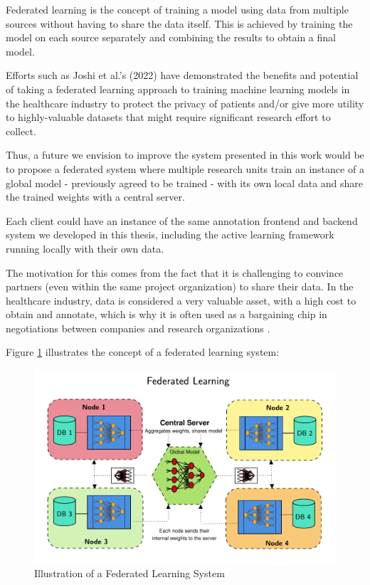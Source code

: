 \documentclass[../main.tex]{subfiles}
\begin{document}

    Federated learning is the concept of training a model using data from multiple sources without having to share the data itself. This is achieved by training the model on each source separately and combining the results to obtain a final model. 
    
    Efforts such as Joshi et al.'s (2022) \cite{joshi_federated_2022} have demonstrated the benefits and potential of taking a federated learning approach to training machine learning models in the healthcare industry to protect the privacy of patients and/or give more utility to highly-valuable datasets that might require significant research effort to collect.
    
    Thus, a future we envision to improve the system presented in this work would be to propose a federated system where multiple research units train an instance of a global model - previously agreed to be trained  - with its own local data and share the trained weights with a central server. 
    
    Each client could have an instance of the same annotation frontend and backend system we developed in this thesis, including the active learning framework running locally with their own data. 
    
    The motivation for this comes from the fact that it is challenging to convince partners (even within the same project organization) to share their data. In the healthcare industry, data is considered a very valuable asset, with a high cost to obtain and annotate, which is why it is often used as a bargaining chip in negotiations between companies and research organizations .

    Figure \ref{fig:federated} illustrates the concept of a federated learning system:

    \begin{figure}
        \centering
        \includegraphics[width=0.85\linewidth]{figures/federated.pdf}
        \caption{Illustration of a Federated Learning System}
        \label{fig:federated}
    \end{figure}
    
\end{document}

